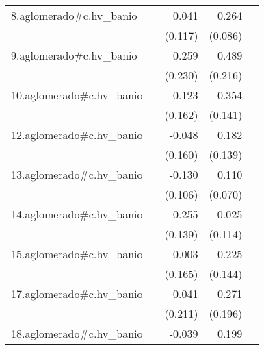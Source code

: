 {\begin{longtable}{l*{4}{D{.}{.}{-1}}}
\addlinespace
8.aglomerado#c.hv\_banio&                     &       0.041         &       0.264\sym{**} &                     \\
            &                     &     (0.117)         &     (0.086)         &                     \\
\addlinespace
9.aglomerado#c.hv\_banio&                     &       0.259         &       0.489\sym{*}  &                     \\
            &                     &     (0.230)         &     (0.216)         &                     \\
\addlinespace
10.aglomerado#c.hv\_banio&                     &       0.123         &       0.354\sym{*}  &                     \\
            &                     &     (0.162)         &     (0.141)         &                     \\
\addlinespace
12.aglomerado#c.hv\_banio&                     &      -0.048         &       0.182         &                     \\
            &                     &     (0.160)         &     (0.139)         &                     \\
\addlinespace
13.aglomerado#c.hv\_banio&                     &      -0.130         &       0.110         &                     \\
            &                     &     (0.106)         &     (0.070)         &                     \\
\addlinespace
14.aglomerado#c.hv\_banio&                     &      -0.255         &      -0.025         &                     \\
            &                     &     (0.139)         &     (0.114)         &                     \\
\addlinespace
15.aglomerado#c.hv\_banio&                     &       0.003         &       0.225         &                     \\
            &                     &     (0.165)         &     (0.144)         &                     \\
\addlinespace
17.aglomerado#c.hv\_banio&                     &       0.041         &       0.271         &                     \\
            &                     &     (0.211)         &     (0.196)         &                     \\
\addlinespace
18.aglomerado#c.hv\_banio&                     &      -0.039         &       0.199\sym{**} &                     \\

\end{longtable}}
